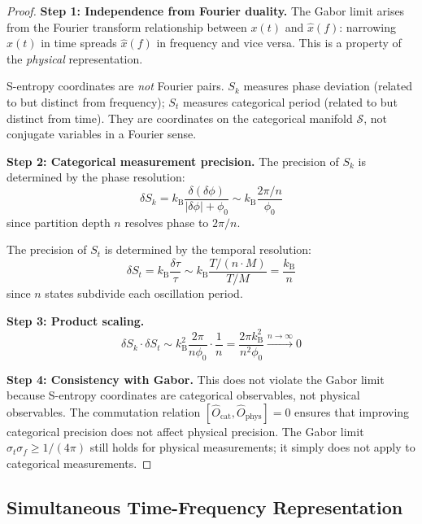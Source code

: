 \documentclass[twocolumn,10pt]{article}
\theoremstyle{remark}
\newcommand{\kB}{k_{\mathrm{B}}}
\newcommand{\Sk}{S_k}
\newcommand{\St}{S_t}
\newcommand{\Ocat}{\hat{O}_{\mathrm{cat}}}
\newcommand{\Ophys}{\hat{O}_{\mathrm{phys}}}
\newcommand{\calS}{\mathcal{S}}
\begin{document}
\begin{proof}
\textbf{Step 1: Independence from Fourier duality.}
The Gabor limit arises from the Fourier transform relationship between $x(t)$ and $\hat{x}(f)$: narrowing $x(t)$ in time spreads $\hat{x}(f)$ in frequency and vice versa. This is a property of the \textit{physical} representation.

S-entropy coordinates are \textit{not} Fourier pairs. $\Sk$ measures phase deviation (related to but distinct from frequency); $\St$ measures categorical period (related to but distinct from time). They are coordinates on the categorical manifold $\calS$, not conjugate variables in a Fourier sense.

\textbf{Step 2: Categorical measurement precision.}
The precision of $\Sk$ is determined by the phase resolution:
\begin{equation}
    \delta \Sk = \kB \frac{\delta(\delta\phi)}{|\delta\phi| + \phi_0} \sim \kB \frac{2\pi/n}{\phi_0}
    \label{eq:Sk_precision}
\end{equation}
since partition depth $n$ resolves phase to $2\pi/n$.

The precision of $\St$ is determined by the temporal resolution:
\begin{equation}
    \delta \St = \kB \frac{\delta\tau}{\tau} \sim \kB \frac{T/(n \cdot M)}{T/M} = \frac{\kB}{n}
    \label{eq:St_precision}
\end{equation}
since $n$ states subdivide each oscillation period.

\textbf{Step 3: Product scaling.}
\begin{equation}
    \delta \Sk \cdot \delta \St \sim \kB^2 \frac{2\pi}{n \phi_0} \cdot \frac{1}{n} = \frac{2\pi \kB^2}{n^2 \phi_0} \xrightarrow{n \to \infty} 0
\end{equation}

\textbf{Step 4: Consistency with Gabor.}
This does not violate the Gabor limit because S-entropy coordinates are categorical observables, not physical observables. The commutation relation $[\Ocat, \Ophys] = 0$ ensures that improving categorical precision does not affect physical precision. The Gabor limit $\sigma_t \sigma_f \geq 1/(4\pi)$ still holds for physical measurements; it simply does not apply to categorical measurements.
\end{proof}

\subsection{Simultaneous Time-Frequency Representation}
\end{document}
